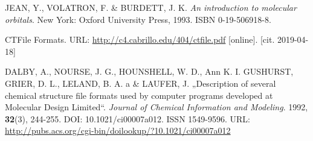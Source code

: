\begin{thebibliography}{10}
JEAN, Y., VOLATRON, F. \& BURDETT, J. K. \textit{An introduction to molecular orbitals}. New York: Oxford University Press, 1993. ISBN 0-19-506918-8.

CTFile Formats. URL: \url{http://c4.cabrillo.edu/404/ctfile.pdf} [online]. [cit. 2019-04-18]

DALBY, A., NOURSE, J. G., HOUNSHELL, W. D., Ann K. I. GUSHURST, GRIER, D. L., LELAND, B. A. a \& LAUFER, J. „Description of several chemical structure file formats used by computer programs developed at Molecular Design Limited“. \textit{Journal of Chemical Information and Modeling}. 1992, \textbf{32}(3), 244-255. DOI: 10.1021/ci00007a012. ISSN 1549-9596. URL: \url{http://pubs.acs.org/cgi-bin/doilookup/?10.1021/ci00007a012}
\end{thebibliography}


\cleardoublepage
